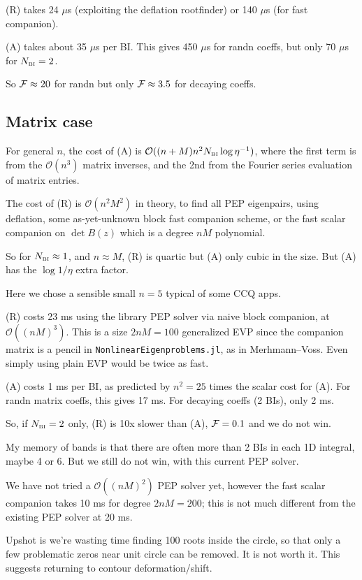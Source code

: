 \documentclass[11pt]{article}
\newcommand{\tbox}[1]{{\mbox{\tiny #1}}}
\newcommand{\bigO}{{\mathcal O}}
\begin{document}
(R) takes 24 $\mu$s (exploiting the deflation rootfinder)
or 140 $\mu$s (for fast companion).

(A) takes about 35 $\mu$s per BI. This gives
450 $\mu$s for randn coeffs, but only 70 $\mu$s for $N_\tbox{BI}=2$.

So ${\cal F} \approx 20$ for randn
but only ${\cal F} \approx 3.5$ for decaying coeffs.

\subsection{Matrix case}

For general $n$,
the cost of (A) is $\bigO((n+M)n^2 N_\tbox{BI} \log \eta^{-1})$,
where the first term is from the $\bigO(n^3)$ matrix inverses,
and the 2nd from the Fourier series evaluation of matrix entries.

The cost of (R) is $\bigO(n^2M^2)$ in theory, to find
all PEP eigenpairs, using deflation, some as-yet-unknown
block fast companion scheme, or the fast scalar companion on
$\det B(z)$ which is a degree $nM$ polynomial.

So for $N_\tbox{BI}\approx 1$, and $n\approx M$,
(R) is quartic but (A) only cubic in the size.
But (A) has the $\log 1/\eta$ extra factor.

Here we chose a sensible small $n=5$ typical of some CCQ apps.

(R) costs 23 ms using the library PEP solver via naive block companion,
at $\bigO((nM)^3)$.
This is a size $2nM=100$ generalized EVP since the companion matrix is
a pencil in {\tt NonlinearEigenproblems.jl}, as in Merhmann--Voss.
Even simply using plain EVP would be twice as fast.

(A) costs 1 ms per BI, as predicted by $n^2=25$ times the scalar cost for (A).
For randn matrix coeffs, this gives 17 ms.
For decaying coeffs (2 BIs), only 2 ms.

So, if $N_\tbox{BI}=2$ only, (R) is 10x slower than (A),
${\cal F} = 0.1$ and we do not win.

My memory of bands is that there are often more than 2 BIs in each
1D integral, maybe 4 or 6. But we still do not win, with this current
PEP solver.

We have not tried a $\bigO((nM)^2)$ PEP solver yet,
however the fast scalar companion takes 10 ms for degree $2nM=200$;
this is not much different from the existing PEP solver at 20 ms.

Upshot is we're wasting time finding 100 roots inside the circle,
so that only a few problematic zeros near unit circle can be removed.
It is not worth it. This suggests returning to contour deformation/shift.
\end{document}
